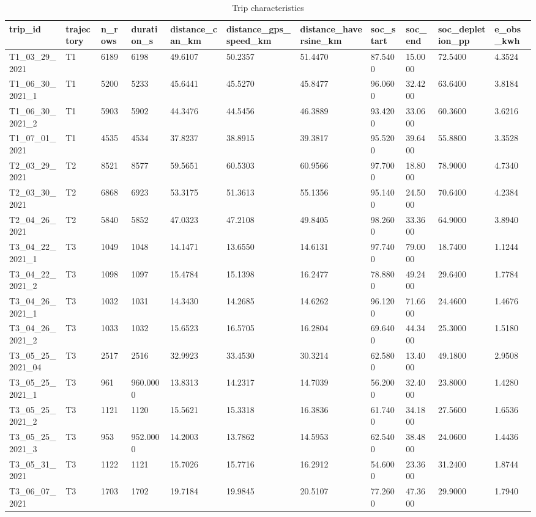 \begin{table}[t]
\centering
\caption{Trip characteristics}
\label{tab:trips}
\begin{tabular}{lllllllllll}
\hline
trip\_id & trajectory & n\_rows & duration\_s & distance\_can\_km & distance\_gps\_speed\_km & distance\_haversine\_km & soc\_start & soc\_end & soc\_depletion\_pp & e\_obs\_kwh \\
\hline
T1\_03\_29\_2021 & T1 & 6189 & 6198 & 49.6107 & 50.2357 & 51.4470 & 87.5400 & 15.0000 & 72.5400 & 4.3524 \\
T1\_06\_30\_2021\_1 & T1 & 5200 & 5233 & 45.6441 & 45.5270 & 45.8477 & 96.0600 & 32.4200 & 63.6400 & 3.8184 \\
T1\_06\_30\_2021\_2 & T1 & 5903 & 5902 & 44.3476 & 44.5456 & 46.3889 & 93.4200 & 33.0600 & 60.3600 & 3.6216 \\
T1\_07\_01\_2021 & T1 & 4535 & 4534 & 37.8237 & 38.8915 & 39.3817 & 95.5200 & 39.6400 & 55.8800 & 3.3528 \\
T2\_03\_29\_2021 & T2 & 8521 & 8577 & 59.5651 & 60.5303 & 60.9566 & 97.7000 & 18.8000 & 78.9000 & 4.7340 \\
T2\_03\_30\_2021 & T2 & 6868 & 6923 & 53.3175 & 51.3613 & 55.1356 & 95.1400 & 24.5000 & 70.6400 & 4.2384 \\
T2\_04\_26\_2021 & T2 & 5840 & 5852 & 47.0323 & 47.2108 & 49.8405 & 98.2600 & 33.3600 & 64.9000 & 3.8940 \\
T3\_04\_22\_2021\_1 & T3 & 1049 & 1048 & 14.1471 & 13.6550 & 14.6131 & 97.7400 & 79.0000 & 18.7400 & 1.1244 \\
T3\_04\_22\_2021\_2 & T3 & 1098 & 1097 & 15.4784 & 15.1398 & 16.2477 & 78.8800 & 49.2400 & 29.6400 & 1.7784 \\
T3\_04\_26\_2021\_1 & T3 & 1032 & 1031 & 14.3430 & 14.2685 & 14.6262 & 96.1200 & 71.6600 & 24.4600 & 1.4676 \\
T3\_04\_26\_2021\_2 & T3 & 1033 & 1032 & 15.6523 & 16.5705 & 16.2804 & 69.6400 & 44.3400 & 25.3000 & 1.5180 \\
T3\_05\_25\_2021\_04 & T3 & 2517 & 2516 & 32.9923 & 33.4530 & 30.3214 & 62.5800 & 13.4000 & 49.1800 & 2.9508 \\
T3\_05\_25\_2021\_1 & T3 & 961 & 960.0000 & 13.8313 & 14.2317 & 14.7039 & 56.2000 & 32.4000 & 23.8000 & 1.4280 \\
T3\_05\_25\_2021\_2 & T3 & 1121 & 1120 & 15.5621 & 15.3318 & 16.3836 & 61.7400 & 34.1800 & 27.5600 & 1.6536 \\
T3\_05\_25\_2021\_3 & T3 & 953 & 952.0000 & 14.2003 & 13.7862 & 14.5953 & 62.5400 & 38.4800 & 24.0600 & 1.4436 \\
T3\_05\_31\_2021 & T3 & 1122 & 1121 & 15.7026 & 15.7716 & 16.2912 & 54.6000 & 23.3600 & 31.2400 & 1.8744 \\
T3\_06\_07\_2021 & T3 & 1703 & 1702 & 19.7184 & 19.9845 & 20.5107 & 77.2600 & 47.3600 & 29.9000 & 1.7940 \\
\hline
\end{tabular}
\end{table}
